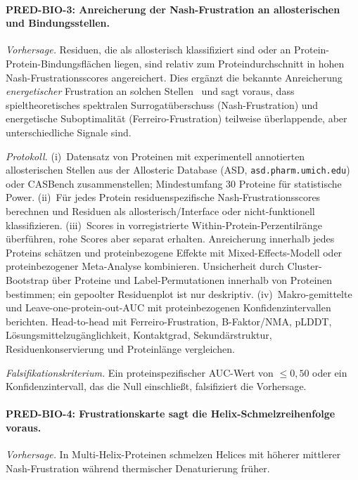 \documentclass[12pt,a4paper]{article}
\theoremstyle{remark}
\begin{document}
\paragraph{PRED-BIO-3: Anreicherung der Nash-Frustration an allosterischen und Bindungsstellen.}

\textit{Vorhersage.}
Residuen, die als allosterisch klassifiziert sind oder an Protein-Protein-Bindungsflächen liegen, sind relativ zum Proteindurchschnitt in hohen Nash-Frustrationsscores angereichert. Dies ergänzt die bekannte Anreicherung \emph{energetischer} Frustration an solchen Stellen~\citep{Ferreiro2014} und sagt voraus, dass spieltheoretisches spektralen Surrogatüberschuss (Nash-Frustration) und energetische Suboptimalität (Ferreiro-Frustration) teilweise überlappende, aber unterschiedliche Signale sind.

\textit{Protokoll.}
(i)~Datensatz von Proteinen mit experimentell annotierten allosterischen Stellen aus der Allosteric Database (ASD, \texttt{asd.pharm.umich.edu}) oder CASBench zusammenstellen; Mindestumfang 30 Proteine für statistische Power.
(ii)~Für jedes Protein residuenspezifische Nash-Frustrationsscores berechnen und Residuen als allosterisch/Interface oder nicht-funktionell klassifizieren.
(iii)~Scores in vorregistrierte Within-Protein-Perzentilränge überführen, rohe Scores aber separat erhalten. Anreicherung innerhalb jedes Proteins schätzen und proteinbezogene Effekte mit Mixed-Effects-Modell oder proteinbezogener Meta-Analyse kombinieren. Unsicherheit durch Cluster-Bootstrap über Proteine und Label-Permutationen innerhalb von Proteinen bestimmen; ein gepoolter Residuenplot ist nur deskriptiv.
(iv)~Makro-gemittelte und Leave-one-protein-out-AUC mit proteinbezogenen Konfidenzintervallen berichten. Head-to-head mit Ferreiro-Frustration, B-Faktor/NMA, pLDDT, Lösungsmittelzugänglichkeit, Kontaktgrad, Sekundärstruktur, Residuenkonservierung und Proteinlänge vergleichen.

\textit{Falsifikationskriterium.}
Ein proteinspezifischer AUC-Wert von $\le 0{,}50$ oder ein Konfidenzintervall, das die Null einschließt, falsifiziert die Vorhersage.

\paragraph{PRED-BIO-4: Frustrationskarte sagt die Helix-Schmelzreihenfolge voraus.}

\textit{Vorhersage.}
In Multi-Helix-Proteinen schmelzen Helices mit höherer mittlerer Nash-Frustration während thermischer Denaturierung früher.
\end{document}
